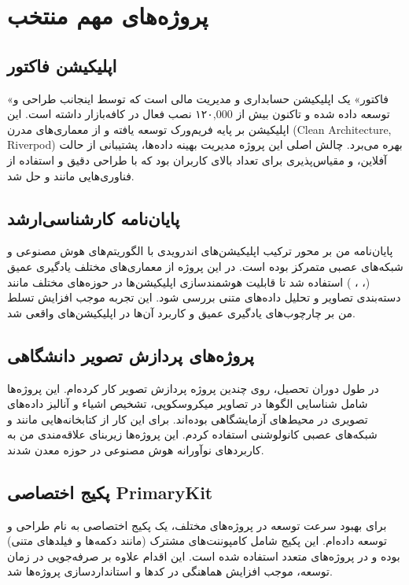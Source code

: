 \chapter{پروژه‌های مهم منتخب}

\section*{اپلیکیشن فاکتور}
«فاکتور» یک اپلیکیشن حسابداری و مدیریت مالی است که توسط اینجانب طراحی و توسعه داده شده و تاکنون بیش از ۱۲۰{,}000 نصب فعال در کافه‌بازار داشته است. 
این اپلیکیشن بر پایه فریم‌ورک  توسعه یافته و از معماری‌های مدرن (Clean Architecture, Riverpod) بهره می‌برد. 
چالش اصلی این پروژه مدیریت بهینه داده‌ها، پشتیبانی از حالت آفلاین، و مقیاس‌پذیری برای تعداد بالای کاربران بود که با طراحی دقیق و استفاده از فناوری‌هایی مانند  و  حل شد. 

\section*{پایان‌نامه کارشناسی‌ارشد}
پایان‌نامه من بر محور ترکیب اپلیکیشن‌های اندرویدی با الگوریتم‌های هوش مصنوعی و شبکه‌های عصبی متمرکز بوده است. 
در این پروژه از معماری‌های مختلف یادگیری عمیق (، ، ) استفاده شد تا قابلیت هوشمندسازی اپلیکیشن‌ها در حوزه‌های مختلف مانند دسته‌بندی تصاویر و تحلیل داده‌های متنی بررسی شود. 
این تجربه موجب افزایش تسلط من بر چارچوب‌های یادگیری عمیق و کاربرد آن‌ها در اپلیکیشن‌های واقعی شد. 

\section*{پروژه‌های پردازش تصویر دانشگاهی}
در طول دوران تحصیل، روی چندین پروژه پردازش تصویر کار کرده‌ام. 
این پروژه‌ها شامل شناسایی الگوها در تصاویر میکروسکوپی، تشخیص اشیاء و آنالیز داده‌های تصویری در محیط‌های آزمایشگاهی بوده‌اند. 
برای این کار از کتابخانه‌هایی مانند  و شبکه‌های عصبی کانولوشنی استفاده کردم. 
این پروژه‌ها زیربنای علاقه‌مندی من به کاربردهای نوآورانه هوش مصنوعی در حوزه معدن شدند. 

\section*{پکیج اختصاصی PrimaryKit}
برای بهبود سرعت توسعه در پروژه‌های مختلف، یک پکیج اختصاصی به نام  طراحی و توسعه داده‌ام. 
این پکیج شامل کامپوننت‌های مشترک (مانند دکمه‌ها و فیلدهای متنی) بوده و در پروژه‌های متعدد  استفاده شده است. 
این اقدام علاوه بر صرفه‌جویی در زمان توسعه، موجب افزایش هماهنگی در کدها و استانداردسازی پروژه‌ها شد.
